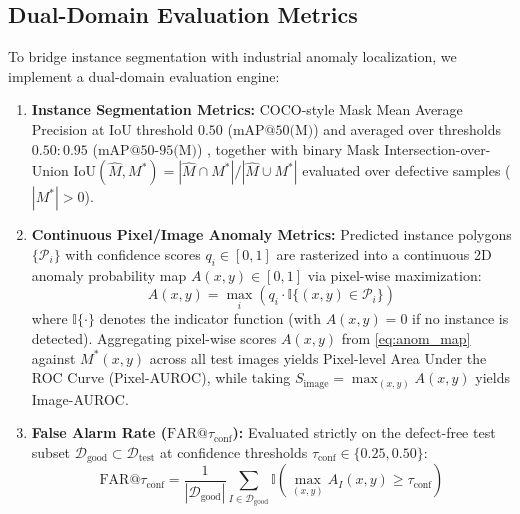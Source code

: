 \subsection{Dual-Domain Evaluation Metrics}
To bridge instance segmentation with industrial anomaly localization, we implement a dual-domain evaluation engine:
\begin{enumerate}
    \item \textbf{Instance Segmentation Metrics:} COCO-style Mask Mean Average Precision at IoU threshold $0.50$ ($\text{mAP@50(M)}$) and averaged over thresholds $0.50:0.95$ ($\text{mAP@50-95(M)}$) \cite{lin2014microsoft}, together with binary Mask Intersection-over-Union $\text{IoU}(\hat{M}, M^*) = |\hat{M} \cap M^*| / |\hat{M} \cup M^*|$ evaluated over defective samples ($|M^*| > 0$).
    \item \textbf{Continuous Pixel/Image Anomaly Metrics:} Predicted instance polygons $\{\mathcal{P}_i\}$ with confidence scores $q_i \in [0, 1]$ are rasterized into a continuous 2D anomaly probability map $A(x, y) \in [0, 1]$ via pixel-wise maximization:
    \begin{equation}
    \label{eq:anom_map}
    A(x, y) = \max_i \left( q_i \cdot \mathbb{I}\{(x, y) \in \mathcal{P}_i\} \right)
    \end{equation}
    where $\mathbb{I}\{\cdot\}$ denotes the indicator function (with $A(x, y) = 0$ if no instance is detected). Aggregating pixel-wise scores $A(x, y)$ from \eqref{eq:anom_map} against $M^*(x, y)$ across all test images yields Pixel-level Area Under the ROC Curve (Pixel-AUROC), while taking $S_{\text{image}} = \max_{(x, y)} A(x, y)$ yields Image-AUROC.
    \item \textbf{False Alarm Rate ($\text{FAR}@\tau_{\text{conf}}$):} Evaluated strictly on the defect-free test subset $\mathcal{D}_{\text{good}} \subset \mathcal{D}_{\text{test}}$ at confidence thresholds $\tau_{\text{conf}} \in \{0.25, 0.50\}$:
    \begin{equation}
    \label{eq:far}
    \text{FAR}@\tau_{\text{conf}} = \frac{1}{|\mathcal{D}_{\text{good}}|} \sum_{I \in \mathcal{D}_{\text{good}}} \mathbb{I}\left( \max_{(x, y)} A_I(x, y) \ge \tau_{\text{conf}} \right)
    \end{equation}
\end{enumerate}

